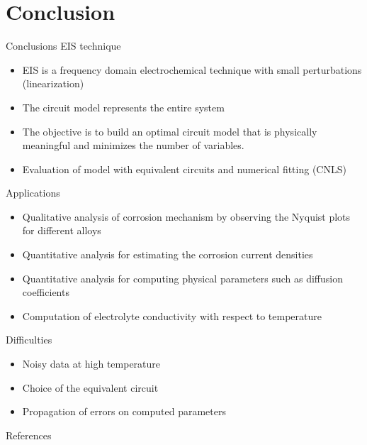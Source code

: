 \documentclass[10pt,compress,handout]{beamer}
\begin{document}
\section{Conclusion}
    \begin{frame}{Conclusions}
        \scriptsize
        EIS technique
            \begin{itemize}
                \item  EIS is a frequency domain electrochemical technique with small perturbations (linearization)
                \item  The circuit model represents the entire system
                \item  The objective is to build an optimal circuit model that is physically meaningful and minimizes the number of
                variables.
                \item  Evaluation of model with equivalent circuits and numerical fitting (CNLS)
            \end{itemize}

        Applications
            \begin{itemize}
                \item  Qualitative analysis of corrosion mechanism by observing the Nyquist plots for different alloys
                \item  Quantitative analysis for estimating the corrosion current densities
                \item  Quantitative analysis for computing physical parameters such as diffusion coefficients
                \item  Computation of electrolyte conductivity with respect to temperature
            \end{itemize}

        Difficulties
            \begin{itemize}
                \item  Noisy data at high temperature
                \item  Choice of the equivalent circuit
                \item  Propagation of errors on computed parameters
            \end{itemize}
    \end{frame}


\begin{frame}[allowframebreaks=0.9]{References}
\AtNextBibliography{\tiny}
\printbibliography
\end{frame}
\end{document}
